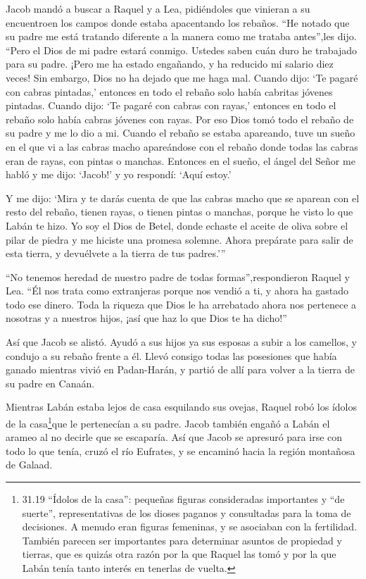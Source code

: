  Jacob mandó a buscar a Raquel y a Lea, pidiéndoles que
vinieran a su encuentroen los campos donde estaba apacentando los
rebaños.  ``He notado que su padre me está tratando
diferente a la manera como me trataba antes'',les dijo. ``Pero el Dios
de mi padre estará conmigo.  Ustedes saben cuán duro he
trabajado para su padre.  ¡Pero me ha estado engañando, y ha
reducido mi salario diez veces! Sin embargo, Dios no ha dejado que me
haga mal.  Cuando dijo: `Te pagaré con cabras pintadas,'
entonces en todo el rebaño solo había cabritas jóvenes pintadas. Cuando
dijo: `Te pagaré con cabras con rayas,' entonces en todo el rebaño solo
había cabras jóvenes con rayas.  Por eso Dios tomó todo el
rebaño de su padre y me lo dio a mi.  Cuando el rebaño se
estaba apareando, tuve un sueño en el que vi a las cabras macho
apareándose con el rebaño donde todas las cabras eran de rayas, con
pintas o manchas.  Entonces en el sueño, el ángel del Señor
me habló y me dijo: `Jacob!' y yo respondí: `Aquí estoy.'

 Y me dijo: `Mira y te darás cuenta de que las cabras macho
que se aparean con el resto del rebaño, tienen rayas, o tienen pintas o
manchas, porque he visto lo que Labán te hizo.  Yo soy el
Dios de Betel, donde echaste el aceite de oliva sobre el pilar de piedra
y me hiciste una promesa solemne. Ahora prepárate para salir de esta
tierra, y devuélvete a la tierra de tus padres.'''

 ``No tenemos heredad de nuestro padre de todas
formas'',respondieron Raquel y Lea.  ``Él nos trata como
extranjeras porque nos vendió a ti, y ahora ha gastado todo ese dinero.
 Toda la riqueza que Dios le ha arrebatado ahora nos
pertenece a nosotras y a nuestros hijos, ¡así que haz lo que Dios te ha
dicho!''

 Así que Jacob se alistó. Ayudó a sus hijos ya sus esposas
a subir a los camellos,  y condujo a su rebaño frente a él.
Llevó consigo todas las posesiones que había ganado mientras vivió en
Padan-Harán, y partió de allí para volver a la tierra de su padre en
Canaán.

 Mientras Labán estaba lejos de casa esquilando sus ovejas,
Raquel robó los ídolos de la casa\footnote{31.19 ``Ídolos de la casa'':
  pequeñas figuras consideradas importantes y ``de suerte'',
  representativas de los dioses paganos y consultadas para la toma de
  decisiones. A menudo eran figuras femeninas, y se asociaban con la
  fertilidad. También parecen ser importantes para determinar asuntos de
  propiedad y tierras, que es quizás otra razón por la que Raquel las
  tomó y por la que Labán tenía tanto interés en tenerlas de vuelta.}que
le pertenecían a su padre.  Jacob también engañó a Labán el
arameo al no decirle que se escaparía.  Así que Jacob se
apresuró para irse con todo lo que tenía, cruzó el río Eufrates, y se
encaminó hacia la región montañosa de Galaad.


